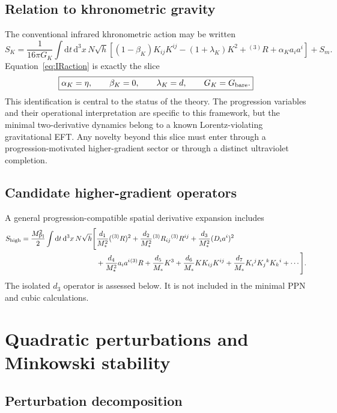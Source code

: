 \documentclass[11pt]{article}
\newcommand{\Mpl}{M_{\rm Pl}}
\newcommand{\Ms}{M_*}
\newcommand{\Gb}{G_{\rm bare}}
\newcommand{\dd}{\mathrm{d}}
\newcommand{\Rthree}{{}^{(3)}R}
\newcommand{\Rthreeij}{{}^{(3)}R_{ij}}
\begin{document}
\subsection{Relation to khronometric gravity}

The conventional infrared khronometric action may be written
\begin{equation}
S_K=\frac{1}{16\pi G_K}\int \dd t\,\dd^3x\,N\sqrt h
\left[(1-\beta_K)K_{ij}K^{ij}-(1+\lambda_K)K^2+\Rthree+\alpha_Ka_i a^i\right]+S_m.
\end{equation}
Equation~\eqref{eq:IRaction} is exactly the slice
\begin{equation}
\boxed{\alpha_K=\eta,\qquad \beta_K=0,\qquad \lambda_K=d,
\qquad G_K=\Gb.}
\label{eq:map}
\end{equation}
This identification is central to the status of the theory.  The progression variables and their operational interpretation are specific to this framework, but the minimal two-derivative dynamics belong to a known Lorentz-violating gravitational EFT.  Any novelty beyond this slice must enter through a progression-motivated higher-gradient sector or through a distinct ultraviolet completion.

\subsection{Candidate higher-gradient operators}

A general progression-compatible spatial derivative expansion includes
\begin{align}
S_{\rm high}=\frac{\Mpl^2}{2}\int \dd t\,\dd^3x\,N\sqrt h\Bigg[&
\frac{d_1}{\Ms^2}(\Rthree)^2+
\frac{d_2}{\Ms^2}\Rthreeij\Rthree^{ij}+
\frac{d_3}{\Ms^2}(D_i a^i)^2
\nonumber\\
&+\frac{d_4}{\Ms^2}a_i a^i\Rthree+
\frac{d_5}{\Ms}K^3+
\frac{d_6}{\Ms}KK_{ij}K^{ij}+
\frac{d_7}{\Ms}K_i{}^jK_j{}^kK_k{}^i+\cdots\Bigg].
\label{eq:high}
\end{align}
The isolated $d_3$ operator is assessed below.  It is not included in the minimal PPN and cubic calculations.

\section{Quadratic perturbations and Minkowski stability}

\subsection{Perturbation decomposition}
\end{document}
